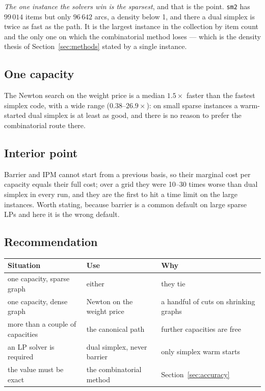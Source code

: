 \documentclass[11pt,a4paper]{article}
\newcommand{\code}[1]{\texttt{#1}}
\begin{document}
\emph{The one instance the solvers win is the sparsest}, and that is the
point. \code{sm2} has $99\,014$ items but only $96\,642$ arcs, a density
below 1, and there a dual simplex is twice as fast as the path. It is the
largest instance in the collection by item count and the only one on which
the combinatorial method loses --- which is the density thesis of
Section~\ref{sec:methods} stated by a single instance.

\subsection{One capacity}

The Newton search on the weight price is a median $1.5\times$ faster than the
fastest simplex code, with a wide range ($0.38$--$26.9\times$): on small
sparse instances a warm-started dual simplex is at least as good, and there
is no reason to prefer the combinatorial route there.

\subsection{Interior point}

Barrier and IPM cannot start from a previous basis, so their marginal cost per
capacity equals their full cost; over a grid they were 10--30 times worse than
dual simplex in every run, and they are the first to hit a time limit on the
large instances. Worth stating, because barrier is a common default on large
sparse LPs and here it is the wrong default.

\subsection{Recommendation}

\begin{center}
\begin{tabular}{@{}p{}p{}p{}@{}}
\toprule
\textbf{Situation} & \textbf{Use} & \textbf{Why}\\
\midrule
one capacity, sparse graph & either & they tie\\
one capacity, dense graph & Newton on the weight price & a handful of cuts on
shrinking graphs\\
more than a couple of capacities & the canonical path & further capacities are
free\\
an LP solver is required & dual simplex, never barrier & only simplex warm
starts\\
the value must be exact & the combinatorial method & Section~\ref{sec:accuracy}\\
\bottomrule
\end{tabular}
\end{center}
\end{document}
